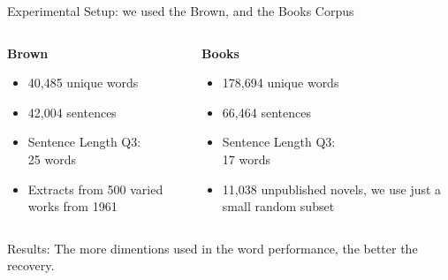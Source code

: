 \documentclass[]{beamer}
\begin{document}
\begin{frame}{Experimental Setup: we used the Brown, and the Books Corpus}
				
	\begin{columns}[T]
		\begin{column}{0.5\textwidth}
			\textbf{Brown}
			\begin{itemize}
				\item 40,485 unique words
				\item 42,004 sentences
				\item Sentence Length Q3: \\\hfill 25 words
				\item Extracts from 500 varied works from 1961
			\end{itemize} 
		\end{column}
		\begin{column}{0.5\textwidth}
			\pause
			\textbf{Books}
			\begin{itemize}
				\item 178,694 unique words
				\item 66,464 sentences 
				\item Sentence Length Q3: \\\hfill 17 words
				\item 11,038 unpublished novels, we use just a small random subset
			\end{itemize}
		\end{column}
	\end{columns}

\end{frame}

\begin{frame}{Results: The more dimentions used in the word performance, the better the recovery.}
	\begin{table}
	\end{table}
\end{frame}
\end{document}
